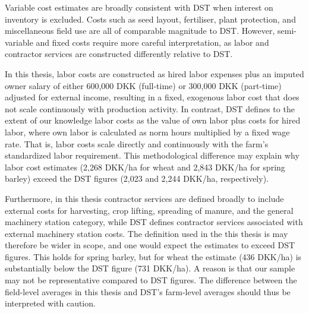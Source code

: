 \documentclass[12pt]{article}
\begin{document}
Variable cost estimates are broadly consistent with DST when interest on inventory is excluded. 
Costs such as seed layout, fertiliser, plant protection, and miscellaneous field use are all of comparable magnitude to DST.
However, semi-variable and fixed costs require more careful interpretation, as labor and contractor services are constructed differently relative to DST.

In this thesis, labor costs are constructed as hired labor expenses plus an imputed owner salary of either 600,000 DKK (full-time) or 300,000 DKK (part-time) adjusted for external income, resulting in a fixed, exogenous labor cost that does not scale continuously with production activity. 
In contrast, DST defines to the extent of our knowledge labor costs as the value of own labor plus costs for hired labor, where own labor is calculated as norm hours multiplied by a fixed wage rate.
That is, labor costs scale directly and continuously with the farm's standardized labor requirement. 
This methodological difference may explain why labor cost estimates (2,268 DKK/ha for wheat and 2,843 DKK/ha for spring barley) exceed the DST figures (2,023 and 2,244 DKK/ha, respectively).

Furthermore, in this thesis contractor services are defined broadly to include external costs for harvesting, crop lifting, spreading of manure, and the general machinery station category, while DST defines contractor services associated with external machinery station costs. 
The definition used in the this thesis is may therefore be wider in scope, and one would expect the estimates to exceed DST figures. 
This holds for spring barley, but for wheat the estimate (436 DKK/ha) is substantially below the DST figure (731 DKK/ha).
A reason is that our sample may not be representative compared to DST figures. 
The difference between the field-level averages in this thesis and DST's farm-level averages should thus be interpreted with caution.  
\end{document}
